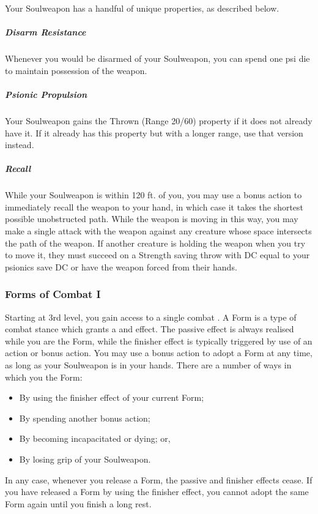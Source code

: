 Your Soulweapon has a handful of unique properties, as described below.

\subparagraph{Disarm Resistance}
Whenever you would be disarmed of your Soulweapon,
you can spend one psi die to maintain possession of the weapon.

\subparagraph{Psionic Propulsion}
Your Soulweapon gains the Thrown (Range 20/60) property if it does not already have it.
If it already has this property but with a longer range, use that version instead.

\subparagraph{Recall}
While your Soulweapon is within 120 ft. of you,
you may use a bonus action to immediately recall the weapon to your hand,
in which case it takes the shortest possible unobstructed path.
While the weapon is moving in this way,
you may make a single attack with the weapon against any creature
whose space intersects the path of the weapon.
If another creature is holding the weapon when you try to move it,
they must succeed on a Strength saving throw with DC equal to your psionics save DC
or have the weapon forced from their hands.

\subsubsection{Forms of Combat I}
Starting at 3rd level,
you gain access to a single combat .
A Form is a type of combat stance which grants a  and  effect.
The passive effect is always realised while you are  the Form,
while the finisher effect is typically triggered by use of an action or bonus action.
You may use a bonus action to adopt a Form at any time,
as long as your Soulweapon is in your hands.
There are a number of ways in which you  the Form:
\begin{itemize}
    \item By using the finisher effect of your current Form;
    \item By spending another bonus action;
    \item By becoming incapacitated or dying; or,
    \item By losing grip of your Soulweapon.
\end{itemize}
In any case, whenever you release a Form, the passive and finisher effects cease.
If you have released a Form by using the finisher effect,
you cannot adopt the same Form again until you finish a long rest.

